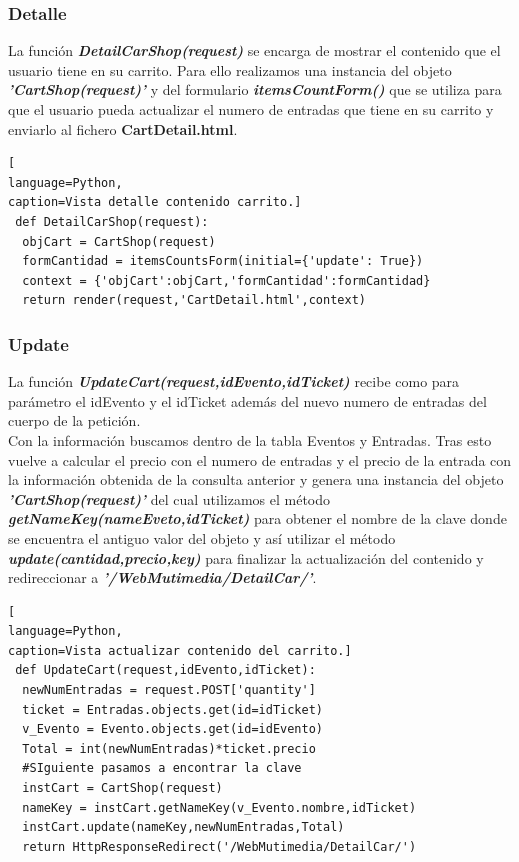 \subsubsection*{Detalle}
La función \textit{\textbf{DetailCarShop(request)}} se encarga de mostrar el contenido que el usuario tiene en su carrito. Para ello realizamos una instancia del objeto \textit{\textbf{'CartShop(request)'}} y del formulario \textit{\textbf{itemsCountForm()}} que se utiliza para que el usuario pueda actualizar el numero de entradas que tiene en su carrito y enviarlo al fichero \textbf{CartDetail.html}.
\begin{lstlisting}[
language=Python,
caption=Vista detalle contenido carrito.]
 def DetailCarShop(request):
  objCart = CartShop(request)
  formCantidad = itemsCountsForm(initial={'update': True})
  context = {'objCart':objCart,'formCantidad':formCantidad}
  return render(request,'CartDetail.html',context)
\end{lstlisting}
\subsubsection*{Update}
La función \textbf{\textit{UpdateCart(request,idEvento,idTicket)}} recibe como para parámetro el idEvento y el idTicket además del nuevo numero de entradas del cuerpo de la petición.
\\Con la información buscamos dentro de la tabla Eventos y Entradas. Tras esto vuelve a calcular el precio con el numero de entradas y el precio de la entrada con la información obtenida de la consulta anterior y genera una instancia del objeto \textit{\textbf{'CartShop(request)'}} del cual utilizamos el método \textit{\textbf{getNameKey(nameEveto,idTicket)}} para obtener el nombre de la clave donde se encuentra el antiguo valor del objeto y así utilizar el método  \textit{\textbf{update(cantidad,precio,key)}} para finalizar la actualización del contenido y redireccionar a \textit{\textbf{'/WebMutimedia/DetailCar/'}}.
\begin{lstlisting}[
language=Python,
caption=Vista actualizar contenido del carrito.]
 def UpdateCart(request,idEvento,idTicket):
  newNumEntradas = request.POST['quantity']
  ticket = Entradas.objects.get(id=idTicket)
  v_Evento = Evento.objects.get(id=idEvento)
  Total = int(newNumEntradas)*ticket.precio
  #SIguiente pasamos a encontrar la clave 
  instCart = CartShop(request)
  nameKey = instCart.getNameKey(v_Evento.nombre,idTicket)
  instCart.update(nameKey,newNumEntradas,Total)
  return HttpResponseRedirect('/WebMutimedia/DetailCar/')
\end{lstlisting}
